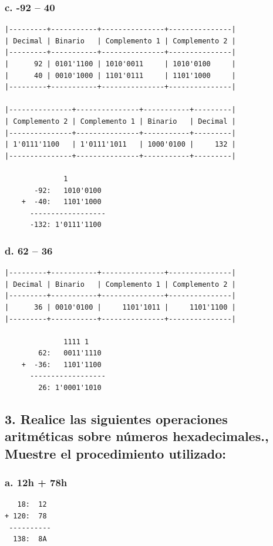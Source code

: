 \documentclass[12pt]{article}
\begin{document}
\subsubsection*{c. -92 – 40}
\label{sec:org77f5fca}
\begin{verbatim}
|---------+-----------+---------------+---------------|
| Decimal | Binario   | Complemento 1 | Complemento 2 |
|---------+-----------+---------------+---------------|
|      92 | 0101'1100 | 1010'0011     | 1010'0100     |
|      40 | 0010'1000 | 1101'0111     | 1101'1000     |
|---------+-----------+---------------+---------------| 

|---------------+---------------+-----------+---------|
| Complemento 2 | Complemento 1 | Binario   | Decimal |
|---------------+---------------+-----------+---------|
| 1'0111'1100   | 1'0111'1011   | 1000'0100 |     132 |
|---------------+---------------+-----------+---------|

              1       
       -92:   1010'0100
    +  -40:   1101'1000 
      ------------------      
      -132: 1'0111'1100
\end{verbatim}

\subsubsection*{d. 62 – 36}
\label{sec:orgad6cd06}
\begin{verbatim}
|---------+-----------+---------------+---------------|
| Decimal | Binario   | Complemento 1 | Complemento 2 |
|---------+-----------+---------------+---------------|
|      36 | 0010'0100 |     1101'1011 |     1101'1100 |
|---------+-----------+---------------+---------------|

              1111 1
        62:   0011'1110 
    +  -36:   1101'1100
      ------------------      
        26: 1'0001'1010
\end{verbatim}

\subsection*{3. Realice las siguientes operaciones aritméticas sobre números hexadecimales., Muestre el procedimiento utilizado:}
\label{sec:orgd5b388d}
\subsubsection*{a. 12h + 78h}
\label{sec:orgbeb306f}
\begin{verbatim}
   18:  12
+ 120:  78
 ----------
  138:  8A
\end{verbatim}
\end{document}
